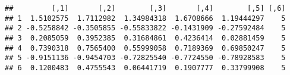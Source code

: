 \documentclass[
]{article}
\newenvironment{Shaded}{\begin{snugshade}}{\end{snugshade}}
\newcommand{\CommentTok}[1]{\textcolor[rgb]{0.56,0.35,0.01}{\textit{#1}}}
\newcommand{\KeywordTok}[1]{\textcolor[rgb]{0.13,0.29,0.53}{\textbf{#1}}}
\newcommand{\NormalTok}[1]{#1}
\newcommand{\OperatorTok}[1]{\textcolor[rgb]{0.81,0.36,0.00}{\textbf{#1}}}
\newcommand{\StringTok}[1]{\textcolor[rgb]{0.31,0.60,0.02}{#1}}
\begin{document}
\begin{Shaded}
\end{Shaded}

\begin{verbatim}
##         [,1]       [,2]        [,3]       [,4]        [,5] [,6]
## 1  1.5102575  1.7112982  1.34984318  1.6708666  1.19444297    5
## 2 -0.5258842 -0.3505855 -0.55833822 -0.1431909 -0.27592484    5
## 3  0.2085059  0.3952385  0.31684861  0.4236414  0.02881459    5
## 4  0.7390318  0.7565400  0.55999058  0.7189369  0.69850247    5
## 5 -0.9151136 -0.9454703 -0.72825540 -0.7724550 -0.78928583    5
## 6  0.1200483  0.4755543  0.06441719  0.1907777  0.33799908    5
\end{verbatim}
\end{document}
